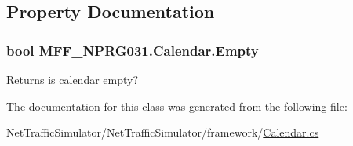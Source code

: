 \subsection{Property Documentation}
\hypertarget{classMFF__NPRG031_1_1Calendar_ac2ebccd4a70e3183e1715ddbde173d06}{
\subsubsection[{Empty}]{\setlength{\rightskip}{0pt plus 5cm}bool M\-F\-F\-\_\-\-N\-P\-R\-G031.\-Calendar.\-Empty\hspace{0.3cm}{\ttfamily [get]}}}\label{classMFF__NPRG031_1_1Calendar_ac2ebccd4a70e3183e1715ddbde173d06}
\begin{DoxyReturn}{Returns}
is calendar empty? 
\end{DoxyReturn}


The documentation for this class was generated from the following file\-:\begin{DoxyCompactItemize}
\item 
Net\-Traffic\-Simulator/\-Net\-Traffic\-Simulator/framework/\hyperlink{Calendar_8cs}{Calendar.\-cs}\end{DoxyCompactItemize}
